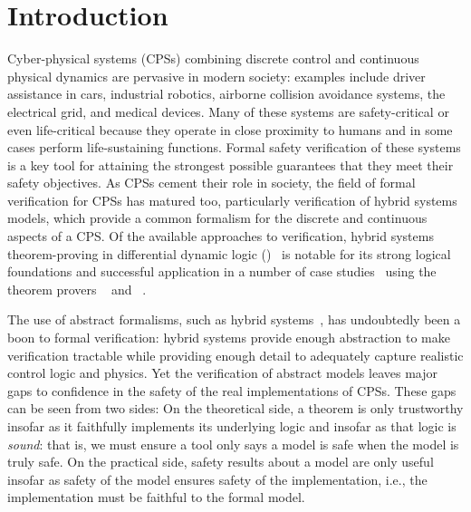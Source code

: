 \documentclass[12pt]{cmuthesis}
\theoremstyle{definition}
\theoremstyle{remark}
\begin{document}

\pagestyle{plain}

\mainmatter


\chapter{Introduction}
\label{ch:introduction}
Cyber-physical systems (CPSs) combining discrete control and continuous physical dynamics are pervasive in modern society: examples include driver assistance in cars, industrial robotics, airborne collision avoidance systems, the electrical grid, and medical devices.
Many of these systems are safety-critical or even life-critical because they operate in close proximity to humans and in some cases perform life-sustaining functions.
Formal safety verification of these systems is a key tool for attaining the strongest possible guarantees that they meet their safety objectives.
As CPSs cement their role in society, the field of formal verification for CPSs has matured too, particularly verification of hybrid systems models, which provide a common formalism for the discrete and continuous aspects of a CPS.
Of the available approaches to verification, hybrid systems theorem-proving in differential dynamic logic (\dL)~\cite{Platzer18,DBLP:journals/jar/Platzer08,DBLP:journals/jar/Platzer17,DBLP:conf/lics/Platzer12b:TR} is notable for its strong logical foundations and successful application in a number of case studies~\cite{DBLP:conf/emsoft/JeanninGKGSZP15,DBLP:conf/fm/LoosPN11,DBLP:conf/rss/MitschGP13,DBLP:conf/hybrid/PlatzerQ08} using the theorem provers \KeYmaera~\cite{DBLP:conf/cade/PlatzerQ08} and \KeYmaeraX~\cite{DBLP:conf/cade/FultonMQVP15}.

The use of abstract formalisms, such as hybrid systems~\cite{DBLP:conf/lics/Henzinger96}, has undoubtedly been a boon to formal verification: hybrid systems provide enough abstraction to make verification tractable while providing enough detail to adequately capture realistic control logic and physics.
Yet the verification of abstract models leaves major gaps to confidence in the safety of the real implementations of CPSs.
These gaps can be seen from two sides: On the theoretical side, a theorem is only trustworthy insofar as it faithfully implements its underlying logic and insofar as that logic is \emph{sound}: that is, we must ensure a tool only says a model is safe when the model is truly safe.
On the practical side, safety results about a model are only useful insofar as safety of the model ensures safety of the implementation, i.e., the implementation must be faithful to the formal model.
\end{document}
